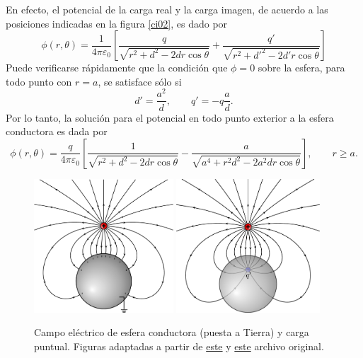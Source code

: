 En efecto, el potencial de la carga real y la carga imagen, de acuerdo a las posiciones indicadas en la figura \ref{ci02}, es dado por
\begin{equation}
 \phi(r,\theta)=\frac{1}{4\pi\varepsilon_0}\left[\frac{q}{\sqrt{
r^2+d^2-2dr\cos\theta } } +\frac{q'}{\sqrt{r^2+d'^2-2d'r\cos\theta}}\right]
\end{equation}
Puede verificarse rápidamente que la condición que $\phi=0$ sobre la esfera, para todo punto con $r=a$, se satisface sólo si
\begin{equation}
 d'=\frac{a^2}{d}, \qquad q'=-q\frac{a}{d}.
\end{equation}
Por lo tanto, la solución para el potencial en todo punto exterior a la
esfera conductora es dada por
\begin{equation}\label{phice}
 \phi(r,\theta)=\frac{q}{4\pi\varepsilon_0}\left[\frac{1}{\sqrt{
r^2+d^2-2dr\cos\theta}}
-\frac{a}{\sqrt{a^4+r^2d^2-2a^2dr\cos\theta}}\right], \qquad r\ge a .
\end{equation}
\begin{center}
\begin{figure}[H]
\centerline{\includegraphics[height=5cm]{fig/fig-metodo-imagen-esfera-01.pdf}
\hspace{2cm}\includegraphics[height=5cm]{fig/fig-metodo-imagen-esfera-02.pdf}}
\caption{Campo eléctrico de esfera conductora (puesta a Tierra) y carga puntual. 
Figuras adaptadas a partir de  \href{http://commons.wikimedia.org/wiki/File:VFPt_metal_ball_grounded.svg}{este} y \href{http://commons.wikimedia.org/wiki/File:VFPt_metal_ball_grounded_transparent.svg}{este} archivo original.}
\label{fig:eyc}
\end{figure}
\end{center}
